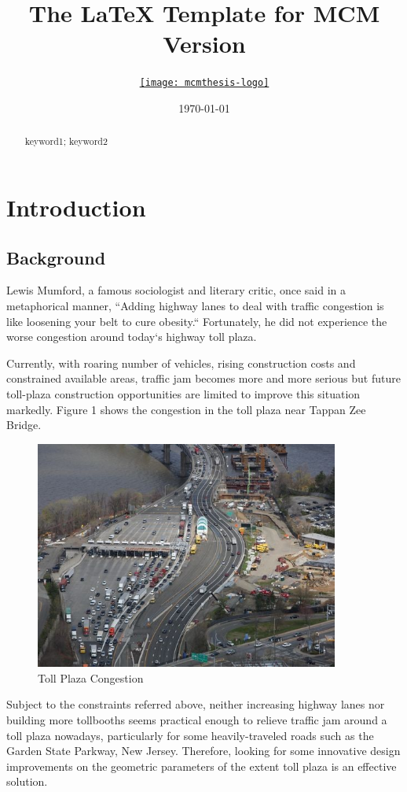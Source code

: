 \documentclass{mcmthesis}
\title{The \LaTeX{} Template for MCM Version \MCMversion}
\author{\small \href{http://www.latexstudio.net/}
  {\texttt{[image: mcmthesis-logo]}}}
\date{\today}
\begin{document}
\begin{abstract}
\lipsum[1]%
\begin{keywords}
keyword1; keyword2
\end{keywords}
\end{abstract}
\maketitle
\tableofcontents
\newpage

\section{Introduction}
\subsection{Background}

Lewis Mumford, a famous sociologist and literary critic,
once said in a metaphorical manner, ``Adding highway lanes
to deal with traffic congestion is like loosening your
belt to cure obesity.`` Fortunately, he did not experience
the worse congestion around today`s highway toll plaza.

Currently, with roaring number of vehicles, rising
construction costs and constrained available areas,
traffic jam becomes more and more serious but future
toll-plaza construction opportunities are limited to
improve this situation markedly. Figure 1 shows the
congestion in the toll plaza near Tappan Zee Bridge.
\begin{figure}[h]
\small
\centering
\includegraphics[width=10cm]{figure1}
\caption{Toll Plaza Congestion}\label{fig1}
\end{figure}
Subject to the constraints referred above, neither
increasing highway lanes nor building more tollbooths
seems practical enough to relieve traffic jam around a
toll plaza nowadays, particularly for some heavily-traveled
 roads such as the Garden State Parkway, New Jersey.
 Therefore, looking for some innovative design improvements
  on the geometric parameters of the extent toll plaza
  is an effective solution.
\end{document}
